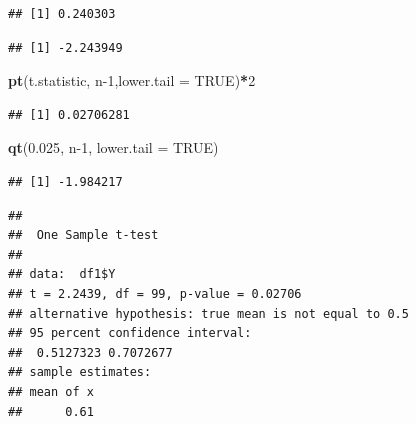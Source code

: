 \documentclass[
]{book}
\newenvironment{Shaded}{\begin{snugshade}}{\end{snugshade}}
\newcommand{\CommentTok}[1]{\textcolor[rgb]{0.56,0.35,0.01}{\textit{#1}}}
\newcommand{\DataTypeTok}[1]{\textcolor[rgb]{0.13,0.29,0.53}{#1}}
\newcommand{\DecValTok}[1]{\textcolor[rgb]{0.00,0.00,0.81}{#1}}
\newcommand{\FloatTok}[1]{\textcolor[rgb]{0.00,0.00,0.81}{#1}}
\newcommand{\KeywordTok}[1]{\textcolor[rgb]{0.13,0.29,0.53}{\textbf{#1}}}
\newcommand{\NormalTok}[1]{#1}
\newcommand{\OperatorTok}[1]{\textcolor[rgb]{0.81,0.36,0.00}{\textbf{#1}}}
\newcommand{\OtherTok}[1]{\textcolor[rgb]{0.56,0.35,0.01}{#1}}
\newcommand{\StringTok}[1]{\textcolor[rgb]{0.31,0.60,0.02}{#1}}
\begin{document}
\begin{verbatim}
## [1] 0.240303
\end{verbatim}

\begin{Shaded}
\end{Shaded}

\begin{verbatim}
## [1] -2.243949
\end{verbatim}

\begin{Shaded}
\begin{Highlighting}[]
\KeywordTok{pt}\NormalTok{(t.statistic, n}\DecValTok{-1}\NormalTok{,}\DataTypeTok{lower.tail =} \OtherTok{TRUE}\NormalTok{)}\OperatorTok{*}\DecValTok{2}
\end{Highlighting}
\end{Shaded}

\begin{verbatim}
## [1] 0.02706281
\end{verbatim}

\begin{Shaded}
\begin{Highlighting}[]
\KeywordTok{qt}\NormalTok{(}\FloatTok{0.025}\NormalTok{, n}\DecValTok{-1}\NormalTok{, }\DataTypeTok{lower.tail =} \OtherTok{TRUE}\NormalTok{)}
\end{Highlighting}
\end{Shaded}

\begin{verbatim}
## [1] -1.984217
\end{verbatim}

\begin{Shaded}
\end{Shaded}

\begin{verbatim}
## 
##  One Sample t-test
## 
## data:  df1$Y
## t = 2.2439, df = 99, p-value = 0.02706
## alternative hypothesis: true mean is not equal to 0.5
## 95 percent confidence interval:
##  0.5127323 0.7072677
## sample estimates:
## mean of x 
##      0.61
\end{verbatim}
\end{document}
